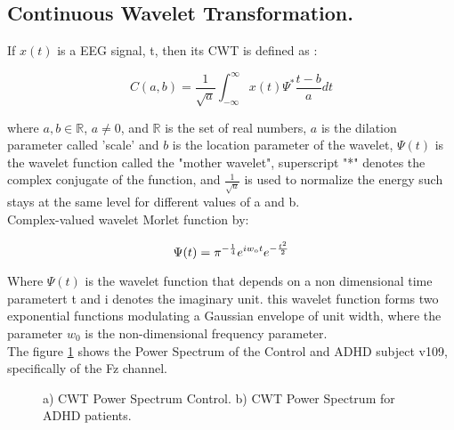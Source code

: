 \documentclass[letterpaper,12pt,openright,oneside]{article}
\begin{document}

\subsection{Continuous Wavelet Transformation.}


If $x(t)$ is a EEG signal, t, then its CWT is defined as \cite{Gho} :

\begin{equation}
C(a,b) = \frac{1}{\sqrt{a}}\int_{-\infty}^\infty x(t) \Psi^* \frac{t-b}{a} dt
\end{equation}

where $a,b \in \mathbb{R}$, $a \neq 0$, and $\mathbb{R}$ is the set of real numbers, $a$ is the dilation parameter called 'scale' and $b$ is the location parameter of the wavelet, $\Psi(t)$ is the wavelet function called the "mother wavelet", superscript "*" denotes the complex conjugate of the function, and $\frac{1}{\sqrt{a}}$ is used to normalize the energy such stays at the same level for different values of a and b.\\

Complex-valued wavelet Morlet function by:


\begin{equation}
\Psi(t) =  \pi^{-\frac{1}{4}} \mathnormal{e}^{\mathnormal{iw_0 t}} \mathnormal{e}^{-\frac{t^2}{2}}
\end{equation}
  
Where $\Psi(t)$ is the wavelet function  that depends on a non dimensional time parametert t and i denotes the imaginary unit. this wavelet function forms two exponential functions modulating a Gaussian envelope of unit width, where the parameter $w_0$ is the non-dimensional frequency parameter.\\



The figure \ref{fig 103} shows the Power Spectrum of the Control and ADHD subject v109, specifically of the Fz channel.

\begin{figure}[H]
\centerline{}
\caption{a) CWT Power Spectrum Control. b) CWT Power Spectrum for ADHD patients.}
\label{fig 103}
\end{figure}




\end{document}
